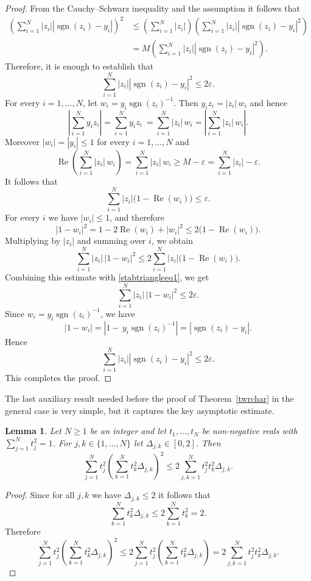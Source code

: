 \documentclass[12pt, reqno]{amsart}
\newtheorem{lem}[twr]{Lemma}
\theoremstyle{definition}
\theoremstyle{remark}
\numberwithin{equation}{section}
\DeclareMathOperator{\sgn}{sgn}
\DeclareMathOperator{\re}{Re}
\begin{document}
\begin{proof} From the Cauchy--Schwarz inequality and the assumption it follows that
\begin{align*}\left ( \sum_{i=1}^{N} |z_i| \left |\sgn(z_i) - y_i \right |\right )^2 &\leq \left ( \sum_{i=1}^{N} |z_i| \right ) \left ( \sum_{i=1}^{N} |z_i| \left |\sgn(z_i) - y_i \right |^2 \right ) \\
&=M \left ( \sum_{i=1}^{N} |z_i| \left |\sgn(z_i) - y_i \right |^2 \right ).
\end{align*}
Therefore, it is enough to establish that 
$$\sum_{i=1}^{N} |z_i| \left |\sgn(z_i) - y_i \right |^2 \leq 2 \varepsilon.$$
For every $i=1,\ldots,N$, let $w_i=y_i\sgn(z_i)^{-1}$. Then $ y_i z_i = |z_i|\,w_i$ and hence
$$\left|\sum_{i=1}^{N} y_i z_i\right| = \sum_{i=1}^{N} y_i z_i\  = \sum_{i=1}^{N} |z_i|\,w_i = \left|\sum_{i=1}^{N} |z_i|\,w_i\right|. $$ Moreover $ |w_i|=|y_i|\le 1 $ for every $i=1,\ldots,N$ and
$$\re\left ( \sum_{i=1}^{N}|z_i|\,w_i \right ) = \sum_{i=1}^{N}|z_i|\,w_i \ge M-\varepsilon = \sum_{i=1}^{N}  |z_i| - \varepsilon. $$ 
It follows that 
\begin{equation} 
\label{stabtriangleeq1} 
\sum_{i=1}^{N} |z_i| \bigl( 1-\re(w_i) \bigr) \le \varepsilon. 
\end{equation} 
For every $i$ we have $|w_i|\leq 1$, and therefore
$$ |1-w_i|^2 = 1-2\re(w_i)+|w_i|^2 \leq 2\bigl(1-\re(w_i)\bigr).$$ 
Multiplying by $|z_i|$ and summing over $i$, we obtain
$$\sum_{i=1}^{N} |z_i|\,|1-w_i|^2 \le  2 \sum_{i=1}^{N} |z_i| \bigl( 1-\re(w_i) \bigr).$$
Combining this estimate with \eqref{stabtriangleeq1}, we get 
$$ \sum_{i=1}^{N} |z_i|\,|1-w_i|^2 \le 2\varepsilon. $$ 
Since $ w_i=y_i\sgn(z_i)^{-1}$, we have 
$$ |1-w_i| = \left| 1-\,y_i\sgn(z_i)^{-1} \right| = \left | \sgn(z_i) - y_i \right |. $$ 
Hence
$$ \sum_{i=1}^{N} |z_i| \left | \sgn(z_i) - y_i \right |^2 \le 2\varepsilon. $$ 
This completes the proof. 

\end{proof}

The last auxiliary result needed before the proof of Theorem~\ref{twrchar} in the general case is very simple, but it captures the key asymptotic estimate.

\begin{lem}
\label{lemasymptotics}
Let $N \geq 1$ be an integer and let $t_1, \ldots, t_N$ be non-negative reals with $\sum_{j=1}^{N} t_j^2 = 1$. For $j, k \in \{1, \ldots, N\}$ let $\Delta_{j, k} \in [0, 2]$. Then
$$\sum_{j=1}^{N} t_j^2 \left ( \sum_{k=1}^{N} t^2_k \Delta_{j, k}   \right )^2 \leq 2\sum_{j, k=1}^{N} t^2_jt^2_k \Delta_{j, k}.$$ 
\end{lem}
\begin{proof}
Since for all $j, k$ we have $\Delta_{j, k} \leq 2$ it follows that
$$\sum_{k=1}^{N} t^2_k \Delta_{j, k} \leq 2 \sum_{k=1}^{N}t_k^2 = 2.$$
Therefore
$$\sum_{j=1}^{N} t_j^2 \left ( \sum_{k=1}^{N} t^2_k \Delta_{j, k} \right )^2 \leq 2\sum_{j=1}^{N} t_j^2  \left ( \sum_{k=1}^{N} t^2_k \Delta_{j, k} \right ) = 2 \sum_{j, k=1}^{N} t^2_jt^2_k \Delta_{j, k}.$$
\end{proof}
\end{document}
